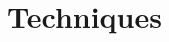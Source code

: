 \documentclass[hyperref,dvipsnames,svgnames,compress]{beamer}
\begin{document}

\section[Techniques]{Techniques}

\end{document}
